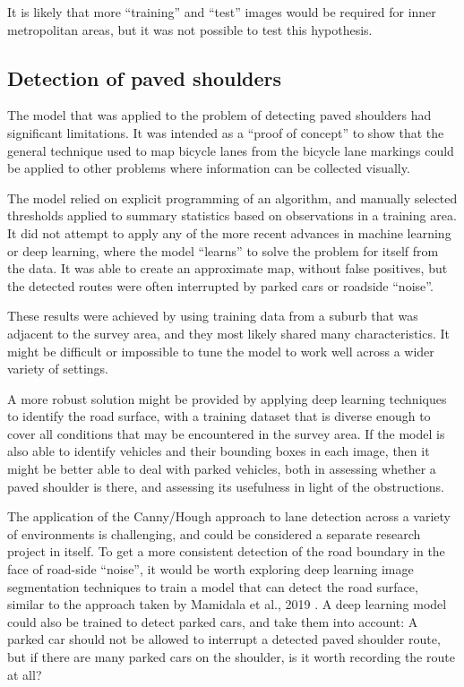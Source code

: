 \documentclass[11pt,twoside]{report}
\begin{document}
It is likely that more ``training'' and ``test'' images would be required for inner metropolitan areas, but it was not possible to test this hypothesis.


\subsection{Detection of paved shoulders}

The model that was applied to the problem of detecting paved shoulders had significant limitations.  It was intended as a ``proof of concept'' to show that the general technique used to map bicycle lanes from the bicycle lane markings could be applied to other problems where information can be collected visually.

The model relied on explicit programming of an algorithm, and manually selected thresholds applied to summary statistics based on observations in a training area.  It did not attempt to apply any of the more recent advances in machine learning or deep learning, where the model ``learns'' to solve the problem for itself from the data.  It was able to create an approximate map, without false positives, but the detected routes were often interrupted by parked cars or roadside ``noise''.

These results were achieved by using training data from a suburb that was adjacent to the survey area, and they most likely shared many characteristics.  It might be difficult or impossible to tune the model to work well across a wider variety of settings.

A more robust solution might be provided by applying deep learning techniques to identify the road surface, with a training dataset that is diverse enough to cover all conditions that may be encountered in the survey area.  If the model is also able to identify vehicles and their bounding boxes in each image, then it might be better able to deal with parked vehicles, both in assessing whether a paved shoulder is there, and assessing its usefulness in light of the obstructions.

The application of the Canny/Hough approach to lane detection across a variety of environments is challenging, and could be considered a separate research project in itself.  To get a more consistent detection of the road boundary in the face of road-side ``noise'', it would be worth exploring deep learning image segmentation techniques to train a model that can detect the road surface, similar to the approach taken by Mamidala et al., 2019 \cite{8929655}.  A deep learning model could also be trained to detect parked cars, and take them into account:  A parked car should not be allowed to interrupt a detected paved shoulder route, but if there are many parked cars on the shoulder, is it worth recording the route at all?
\end{document}
